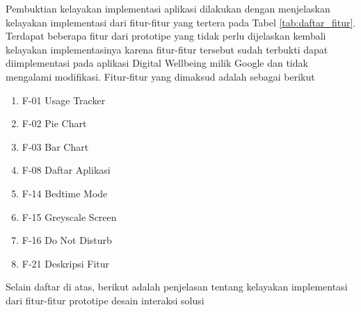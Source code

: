 Pembuktian kelayakan implementasi aplikasi dilakukan dengan menjelaskan kelayakan implementasi dari fitur-fitur yang tertera pada Tabel \ref{tab:daftar_fitur}. Terdapat beberapa fitur dari prototipe yang tidak perlu dijelaskan kembali kelayakan implementasinya karena fitur-fitur tersebut sudah terbukti dapat diimplementasi pada aplikasi Digital Wellbeing milik Google dan tidak mengalami modifikasi. Fitur-fitur yang dimaksud adalah sebagai berikut

\begin{enumerate}
  \item F-01 Usage Tracker
  \item F-02 Pie Chart
  \item F-03 Bar Chart
  \item F-08 Daftar Aplikasi
  \item F-14 Bedtime Mode
  \item F-15 Greyscale Screen
  \item F-16 Do Not Disturb
  \item F-21 Deskripsi Fitur
\end{enumerate}

Selain daftar di atas, berikut adalah penjelasan tentang kelayakan implementasi dari fitur-fitur prototipe desain interaksi solusi

